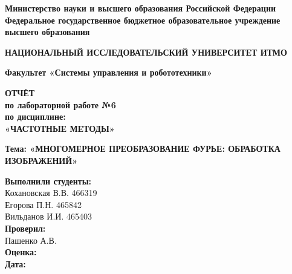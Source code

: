 \documentclass[a4paper, 12pt]{article}
\begin{document}
\begin{titlepage}
    \begin{center}
        \textbf{Министерство науки и высшего образования Российской Федерации} \\
        \textbf{Федеральное государственное бюджетное образовательное учреждение \\ высшего образования}
        \vspace{0.25cm}
        
        \textbf{НАЦИОНАЛЬНЫЙ ИССЛЕДОВАТЕЛЬСКИЙ УНИВЕРСИТЕТ ИТМО}
        \vspace{0.5cm}
        
        \textbf{Факультет «Системы управления и робототехники»} \\
        \vspace{2cm}
    \end{center}
    
    \begin{center}
        \large \textbf{ОТЧЁТ} \\
        \large \textbf{по лабораторной работе №6} \\
        \large \textbf{по дисциплине:} \\
        \Large \textbf{«ЧАСТОТНЫЕ МЕТОДЫ»} \\
        \vspace{0.7cm}
        
        \large \textbf{Тема: «МНОГОМЕРНОЕ ПРЕОБРАЗОВАНИЕ ФУРЬЕ: ОБРАБОТКА
ИЗОБРАЖЕНИЙ»} \\
        \vspace{2cm}
    \end{center}
    
    \begin{flushright}
        \begin{minipage}{0.45\textwidth} %
            \textbf{Выполнили студенты:} \\
            Кохановская В.В. 466319\\ %
            Егорова П.Н. 465842\\ %
            Вильданов И.И. 465403\\ %
            \textbf{Проверил:} \\
            Пашенко А.В. \\ %
            \textbf{Оценка:} \underline{\hspace{2cm}} \\
            \textbf{Дата:} \underline{\hspace{2cm}} \\
        \end{minipage}
    \end{flushright}
    

\end{titlepage}
\end{document}

